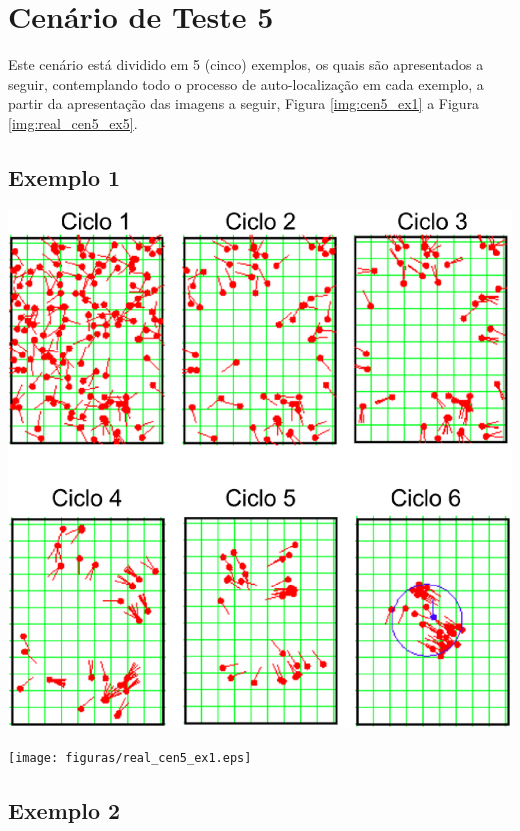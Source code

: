 \section{Cenário de Teste 5}
\label{sec:cenario5}

Este cenário está dividido em 5 (cinco) exemplos, os quais são apresentados a seguir, contemplando todo o processo de auto-localização
em cada exemplo, a partir da apresentação das imagens a seguir, Figura \ref{img:cen5_ex1} a Figura \ref{img:real_cen5_ex5}.

\subsection{Exemplo 1}

{\centering
\includegraphics[scale=0.4]{figuras/cen5_ex1.eps}
\label{img:cen5_ex1}
\par}

{\centering
\texttt{[image: figuras/real\_cen5\_ex1.eps]}
\label{img:real_cen5_ex1}
\par}

\subsection{Exemplo 2}

